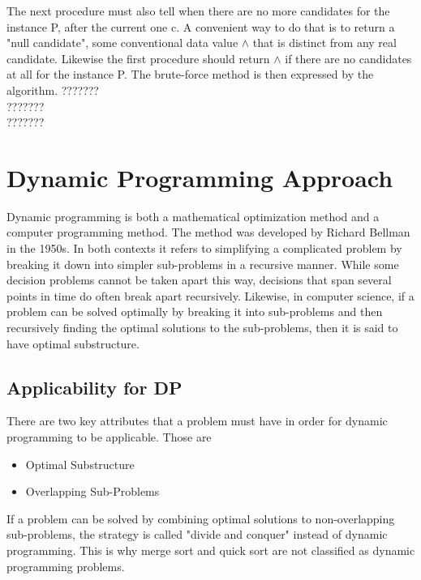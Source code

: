 \documentclass{report}
\begin{document}
The next procedure must also tell when there are no more candidates for the instance P, after the current one c. A convenient way to do that is to return a "null candidate", some conventional data value $\land$ that is distinct from any real candidate. Likewise the first procedure should return $\land$ if there are no candidates at all for the instance P. The brute-force method is then expressed by the algorithm.
???????\\
???????\\
???????

\newpage
\section{Dynamic Programming Approach}
\bigskip
Dynamic programming is both a mathematical optimization method and a computer programming method. The method was developed by Richard Bellman in the 1950s.
In both contexts it refers to simplifying a complicated problem by breaking it down into simpler sub-problems in a recursive manner. While some decision problems cannot be taken apart this way, decisions that span several points in time do often break apart recursively. Likewise, in computer science, if a problem can be solved optimally by breaking it into sub-problems and then recursively finding the optimal solutions to the sub-problems, then it is said to have optimal substructure.
\bigskip
\subsection{Applicability for DP}
There are two key attributes that a problem must have in order for dynamic programming to be applicable. Those are 
\begin{itemize}
    \item {Optimal Substructure} 
    \item {Overlapping Sub-Problems}
\end{itemize}
If a problem can be solved by combining optimal solutions to non-overlapping sub-problems, the strategy is called "divide and conquer" instead of dynamic programming. This is why merge sort and quick sort are not classified as dynamic programming problems.


\newpage
\end{document}

